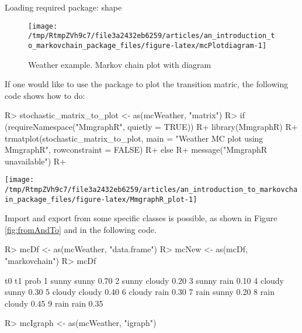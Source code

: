 \documentclass[
  nojss]{jss}
\begin{document}
\begin{CodeChunk}

\begin{CodeOutput}
Loading required package: shape
\end{CodeOutput}
\begin{figure}

{\centering \texttt{[image: /tmp/RtmpZVh9c7/file3a2432eb6259/articles/an\_introduction\_to\_markovchain\_package\_files/figure-latex/mcPlotdiagram-1]} 

}

\caption[Weather example]{Weather example. Markov chain plot with diagram}\label{fig:mcPlotdiagram}
\end{figure}
\end{CodeChunk}

If one would like to use the  package \citep{pkg:MmgraphR} to plot the transition matric, the following code shows how to do:

\begin{CodeChunk}

\begin{CodeInput}
R> stochastic_matrix_to_plot <- as(mcWeather, "matrix")
R> if (requireNamespace("MmgraphR", quietly = TRUE)) {
R+   library(MmgraphR)
R+   trmatplot(stochastic_matrix_to_plot, main = "Weather MC plot using MmgraphR", rowconstraint = FALSE)
R+   } else {
R+   message("MmgraphR unavailable")
R+   }
\end{CodeInput}


\begin{center}\texttt{[image: /tmp/RtmpZVh9c7/file3a2432eb6259/articles/an\_introduction\_to\_markovchain\_package\_files/figure-latex/MmgraphR\_plot-1]} \end{center}

\end{CodeChunk}

Import and export from some specific classes is possible, as shown in Figure \ref{fig:fromAndTo} and in the following code.

\begin{CodeChunk}

\begin{CodeInput}
R> mcDf <- as(mcWeather, "data.frame")
R> mcNew <- as(mcDf, "markovchain")
R> mcDf
\end{CodeInput}

\begin{CodeOutput}
      t0     t1 prob
1  sunny  sunny 0.70
2  sunny cloudy 0.20
3  sunny   rain 0.10
4 cloudy  sunny 0.30
5 cloudy cloudy 0.40
6 cloudy   rain 0.30
7   rain  sunny 0.20
8   rain cloudy 0.45
9   rain   rain 0.35
\end{CodeOutput}

\begin{CodeInput}
R> mcIgraph <- as(mcWeather, "igraph")
\end{CodeInput}
\end{CodeChunk}
\end{document}
